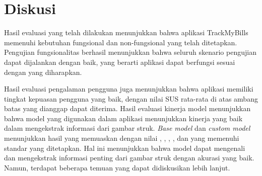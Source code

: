 \section{Diskusi}
\label{sec:diskusi}

Hasil evaluasi yang telah dilakukan menunjukkan bahwa aplikasi TrackMyBills memenuhi kebutuhan fungsional dan non-fungsional yang telah ditetapkan. Pengujian fungsionalitas berhasil menunjukkan bahwa seluruh skenario pengujian dapat dijalankan dengan baik, yang berarti aplikasi dapat berfungsi sesuai dengan yang diharapkan. 

Hasil evaluasi pengalaman pengguna juga menunjukkan bahwa aplikasi memiliki tingkat kepuasan pengguna yang baik, dengan nilai SUS rata-rata di atas ambang batas yang dianggap dapat diterima. Hasil evaluasi kinerja model menunjukkan bahwa model yang digunakan dalam aplikasi menunjukkan kinerja yang baik dalam mengekstrak informasi dari gambar struk. \emph{Base model} dan \emph{custom model} menunjukkan hasil yang memuaskan dengan nilai \accuracy, \precision, \recall, \fscore, dan \mcer{} yang memenuhi standar yang ditetapkan. Hal ini menunjukkan bahwa model dapat mengenali dan mengekstrak informasi penting dari gambar struk dengan akurasi yang baik. Namun, terdapat beberapa temuan yang dapat didiskusikan lebih lanjut.




